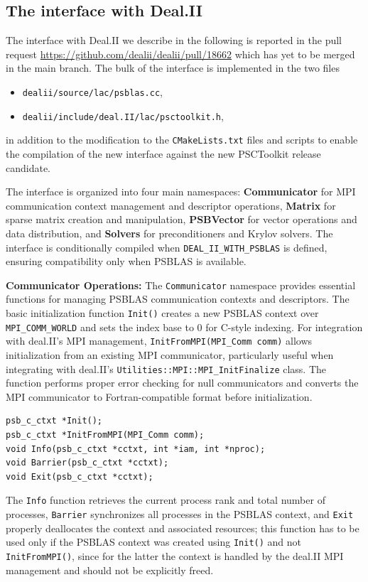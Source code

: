 \documentclass[a4paper,12pt]{article}
\begin{document}
\subsection{The interface with Deal.II}

The interface with Deal.II we describe in the following is reported in the pull request
\url{https://github.com/dealii/dealii/pull/18662} which has yet to be merged in the main branch.
The bulk of the interface is implemented in the two files
\begin{itemize}
    \item \texttt{dealii/source/lac/psblas.cc},
    \item \texttt{dealii/include/deal.II/lac/psctoolkit.h},
\end{itemize}
in addition to the modification to the \texttt{CMakeLists.txt} files and scripts to enable the 
compilation of the new interface against the new PSCToolkit release candidate.

The interface is organized into four main namespaces: \textbf{Communicator} for MPI communication 
context management and descriptor operations, \textbf{Matrix} for sparse matrix creation and manipulation, 
\textbf{PSBVector} for vector operations and data distribution, and \textbf{Solvers} for preconditioners 
and Krylov solvers. The interface is conditionally compiled when \texttt{DEAL\_II\_WITH\_PSBLAS} 
is defined, ensuring compatibility only when PSBLAS is available.

\textbf{Communicator Operations:} The \texttt{Communicator} namespace provides essential functions 
for managing PSBLAS communication contexts and descriptors. The basic initialization function 
\texttt{Init()} creates a new PSBLAS context over \texttt{MPI\_COMM\_WORLD} and sets the index 
base to 0 for C-style indexing. For integration with deal.II's MPI management, 
\lstinline{InitFromMPI(MPI_Comm comm)} allows initialization from an existing MPI communicator, 
particularly useful when integrating with deal.II's \lstinline{Utilities::MPI::MPI_InitFinalize} class. 
The function performs proper error checking for null communicators and converts the MPI communicator to 
Fortran-compatible format before initialization.
\begin{lstlisting}[caption=Core communicator functions]
psb_c_ctxt *Init();
psb_c_ctxt *InitFromMPI(MPI_Comm comm);
void Info(psb_c_ctxt *cctxt, int *iam, int *nproc);
void Barrier(psb_c_ctxt *cctxt);
void Exit(psb_c_ctxt *cctxt);
\end{lstlisting}
The \texttt{Info} function retrieves the current process rank and total number of processes, 
\texttt{Barrier} synchronizes all processes in the PSBLAS context, and \texttt{Exit} properly deallocates 
the context and associated resources; this function has to be used only if the PSBLAS context was created
using \texttt{Init()} and not \texttt{InitFromMPI()}, since for the latter the context is handled by the
deal.II MPI management and should not be explicitly freed.
\end{document}
